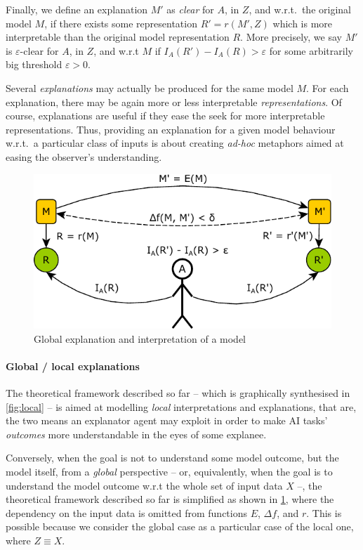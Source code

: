 \documentclass[12pt,a4paper,openright,twoside]{book}
\begin{document}
Finally, we define an explanation $M'$ as \emph{clear} for $A$, in $Z$, and w.r.t.\ the original model $M$, if there exists some representation $R' = r(M', Z)$ which is more interpretable than the original model representation $R$.
%
More precisely, we say $M'$ is $\varepsilon$-clear for $A$, in $Z$, and w.r.t $M$ if $I_A(R') - I_A(R) > \varepsilon$ for some arbitrarily big threshold $\varepsilon > 0$.

Several \emph{explanations} may actually be produced for the same model $M$.
%
For each explanation, there may be again more or less interpretable \emph{representations}.
%
Of course, explanations are useful if they ease the seek for more interpretable representations.
%
Thus, providing an explanation for a given model behaviour w.r.t.\ a particular class of inputs is about creating \emph{ad-hoc} metaphors aimed at easing the observer's understanding.

\begin{figure}
    \centering
    \includegraphics[width=.5\linewidth]{figures/global.pdf}
    \caption{Global explanation and interpretation of a model}
    \label{fig:global}
\end{figure}

\paragraph{Global / local explanations}

The theoretical framework described so far -- which is graphically synthesised in \cref{fig:local} -- is aimed at modelling \emph{local} interpretations and explanations, that are, the two means an explanator agent may exploit in order to make AI tasks' \emph{outcomes} more understandable in the eyes of some explanee.

Conversely, when the goal is not to understand some model outcome, but the model itself, from a \emph{global} perspective -- or, equivalently, when the goal is to understand the model outcome w.r.t the whole set of input data $X$ --, the theoretical framework described so far is simplified as shown in \cref{fig:global}, where the dependency on the input data is omitted from functions $E$, $\Delta f$, and $r$.
%
This is possible because we consider the global case as a particular case of the local one, where $Z \equiv X$.
\end{document}
